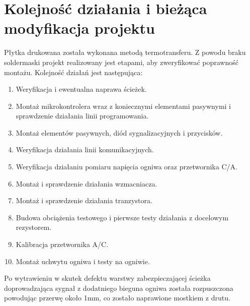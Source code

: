 \documentclass[polish,engineer]{polsl-msth}
\begin{document}
\section{Kolejność działania i bieżąca modyfikacja projektu\label{section:przerobki}}
Płytka drukowana została wykonana metodą termotransferu. Z powodu braku soldermaski projekt realizowany jest etapami, aby zweryfikować poprawność montażu. Kolejność działań jest następująca:
\begin{enumerate}
    \item Weryfikacja i ewentualna naprawa ścieżek.
    \item Montaż mikrokontrolera wraz z koniecznymi elementami pasywnymi i sprawdzenie działania linii programowania.
    \item Montaż elementów pasywnych, diód sygnalizacyjnych i przycisków.
    \item Weryfikacja działania linii komunikacyjnych.
    \item Weryfikacja działaniu pomiaru napięcia ogniwa oraz przetwornika C/A.
    \item Montaż i sprawdzenie działania wzmacniacza.
    \item Montaż i sprawdzenie działania tranzystora.
    \item Budowa obciążenia testowego i pierwsze testy działania z docelowym rezystorem.
    \item Kalibracja przetwornika A/C.
    \item Montaż uchwytu ogniwa i testy na ogniwie.
\end{enumerate}
Po wytrawieniu w skutek defektu warstwy zabezpieczającej ścieżka doprowadzająca sygnał z dodatniego bieguna ogniwa została rozpuszczona powodując przerwę około 1mm, co zostało naprawione mostkiem z drutu.
\end{document}
